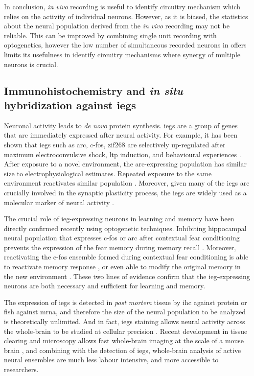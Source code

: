 In conclusion, \textit{in vivo} recording is useful to identify circuitry mechanism which relies on the activity of individual neurons. However, as it is biased, the statistics about the neural population derived from the \textit{in vivo} recording may not be reliable. This can be improved by combining single unit recording with optogenetics, however the low number of simultaneous recorded neurons in offers limits its usefulness in identify circuitry mechanisms where synergy of multiple neurons is crucial. 

\subsection{Immunohistochemistry and \textit{in situ} hybridization against \glspl{ieg}}
Neuronal activity leads to \textit{de novo} protein synthesis. \Glspl{ieg} are a group of genes that are immediately expressed after neural activity. For example, it has been shown that \glspl{ieg} such as \gls{arc}, c-fos, zif268 are selectively up-regulated after maximum electroconvulsive shock, \gls{ltp} induction, and behavioural experiences \citep{guzowski99, vann00, hall01}. After exposure to a novel environment, the \gls{arc}-expressing population has similar size to electrophysiological estimates. Repeated exposure to the same environment reactivates similar population \citep{guzowski06, niibori12}. Moreover, given many of the \glspl{ieg} are crucially involved in the synaptic plasticity process, the \glspl{ieg} are widely used as a molecular marker of neural activity \citep{minatohara15}. 

The crucial role of \gls{ieg}-expressing neurons in learning and memory have been directly confirmed recently using optogenetic techniques. Inhibiting hippocampal neural population that expresses c-fos or \gls{arc} after contextual fear conditioning prevents the expression of the fear memory during memory recall \citep{denny14, tanaka14}. Moreover, reactivating the c-fos ensemble formed during contextual fear conditioning is able to reactivate memory response \citep{liu12, cowansage14, ohkawa15}, or even able to modify the original memory in the new environment \citep{ramirez13, redondo14}. These two lines of evidence confirm that the \gls{ieg}-expressing neurons are both necessary and sufficient for learning and memory. 

The expression of \glspl{ieg} is detected in \textit{post mortem} tissue by \gls{ihc} against protein or \gls{fish} against \gls{mrna}, and therefore the size of the neural population to be analyzed is theoretically unlimited. And in fact, \glspl{ieg} staining allows neural activity across the whole-brain to be studied at cellular precision \citep{wheeler13}. Recent development in tissue clearing and microscopy allows fast whole-brain imaging at the scale of a mouse brain \citep{chung13, tomer14}, and combining with the detection of \glspl{ieg}, whole-brain analysis of active neural ensembles are much less labour intensive, and more accessible to researchers.   

